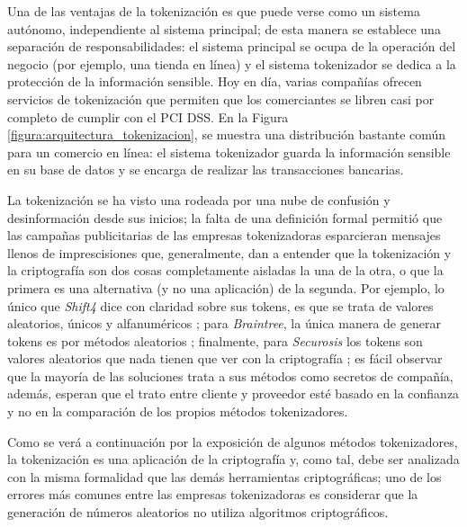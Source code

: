 Una de las ventajas de la tokenización es que puede verse como un sistema
autónomo, independiente al sistema principal; de esta manera se establece una
separación de responsabilidades: el sistema principal se ocupa de la operación
del negocio (por ejemplo, una tienda en línea) y el sistema tokenizador se
dedica a la protección de la información sensible. Hoy en día, varias compañías
ofrecen servicios de tokenización que permiten que los comerciantes se libren
casi por completo de cumplir con el PCI DSS. En la Figura
\ref{figura:arquitectura_tokenizacion}, se muestra una distribución bastante
común para un comercio en línea: el sistema tokenizador guarda la información
sensible en su base de datos y se encarga de realizar las transacciones
bancarias.


La tokenización se ha visto una rodeada por una nube de confusión y 
desinformación desde sus inicios; la falta de una definición formal permitió
que las campañas publicitarias de las empresas tokenizadoras esparcieran 
mensajes llenos de imprescisiones que, generalmente, dan a entender que la
tokenización y la criptografía son dos cosas completamente aisladas la una de la
otra, o que la primera es una alternativa (y no una aplicación) de la segunda.
Por ejemplo, lo único que \textit{Shift4} dice con claridad sobre sus tokens,
es que se trata de valores aleatorios, únicos y alfanuméricos \cite{shif4_uno}; 
para \textit{Braintree}, la única manera de generar tokens es por métodos
aleatorios \cite{braintree_uno}; finalmente, para \textit{Securosis} los tokens
son valores aleatorios que nada tienen que ver con la criptografía
\cite{securosis}; es fácil observar que la mayoría de las soluciones trata a
sus métodos como secretos de compañía, además, esperan que el trato entre
cliente y proveedor esté basado en la confianza y no en la comparación de los
propios métodos tokenizadores.


Como se verá a continuación por la exposición de algunos métodos tokenizadores,
la tokenización es una aplicación de la criptografía y, como tal, debe ser
analizada con la misma formalidad que las demás herramientas criptográficas; uno
de los errores más comunes entre las empresas tokenizadoras es considerar que 
la generación de números aleatorios no utiliza algoritmos criptográficos.

